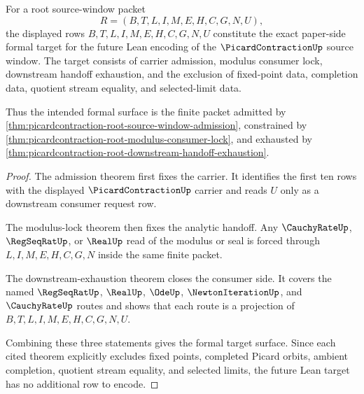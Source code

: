 \begin{theorem}
\label{thm:picardcontraction-source-window-formal-target}
For a root source-window packet
$$
R=(B,T,L,I,M,E,H,C,G,N,U),
$$
the displayed rows $B,T,L,I,M,E,H,C,G,N,U$ constitute the exact paper-side formal target for the future Lean encoding of the $\PicardContractionUp$ source window. The target consists of carrier admission, modulus consumer lock, downstream handoff exhaustion, and the exclusion of fixed-point data, completion data, quotient stream equality, and selected-limit data.

Thus the intended formal surface is the finite packet admitted by \autoref{thm:picardcontraction-root-source-window-admission}, constrained by \autoref{thm:picardcontraction-root-modulus-consumer-lock}, and exhausted by \autoref{thm:picardcontraction-root-downstream-handoff-exhaustion}.
\end{theorem}
\begin{proof}
The admission theorem first fixes the carrier. It identifies the first ten rows with the displayed $\PicardContractionUp$ carrier and reads $U$ only as a downstream consumer request row.

The modulus-lock theorem then fixes the analytic handoff. Any $\CauchyRateUp$, $\RegSeqRatUp$, or $\RealUp$ read of the modulus or seal is forced through $L,I,M,E,H,C,G,N$ inside the same finite packet.

The downstream-exhaustion theorem closes the consumer side. It covers the named $\RegSeqRatUp$, $\RealUp$, $\OdeUp$, $\NewtonIterationUp$, and $\CauchyRateUp$ routes and shows that each route is a projection of $B,T,L,I,M,E,H,C,G,N,U$.

Combining these three statements gives the formal target surface. Since each cited theorem explicitly excludes fixed points, completed Picard orbits, ambient completion, quotient stream equality, and selected limits, the future Lean target has no additional row to encode.
\end{proof}

